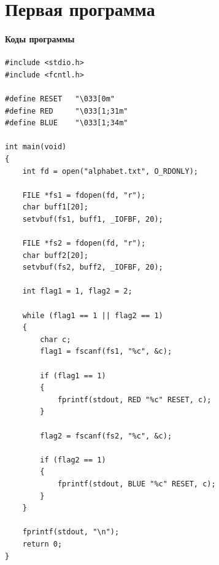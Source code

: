\chapter{Первая программа}

\subsubsection{Коды программы}

\begin{center}
    \captionsetup{justification=raggedright,singlelinecheck=off}
    \begin{lstlisting}[label=lst:CIO1,caption=Один поток]
#include <stdio.h>
#include <fcntl.h>

#define RESET   "\033[0m"
#define RED     "\033[1;31m"
#define BLUE    "\033[1;34m"

int main(void)
{
    int fd = open("alphabet.txt", O_RDONLY);
    
    FILE *fs1 = fdopen(fd, "r");
    char buff1[20];
    setvbuf(fs1, buff1, _IOFBF, 20);
    
    FILE *fs2 = fdopen(fd, "r");
    char buff2[20];
    setvbuf(fs2, buff2, _IOFBF, 20);
    
    int flag1 = 1, flag2 = 2;
    
    while (flag1 == 1 || flag2 == 1)
    {
        char c;
        flag1 = fscanf(fs1, "%c", &c);

        if (flag1 == 1) 
        {
            fprintf(stdout, RED "%c" RESET, c);
        }

        flag2 = fscanf(fs2, "%c", &c);

        if (flag2 == 1)
        { 
            fprintf(stdout, BLUE "%c" RESET, c); 
        }
    }

    fprintf(stdout, "\n");
    return 0;
}
\end{lstlisting}
\end{center}

